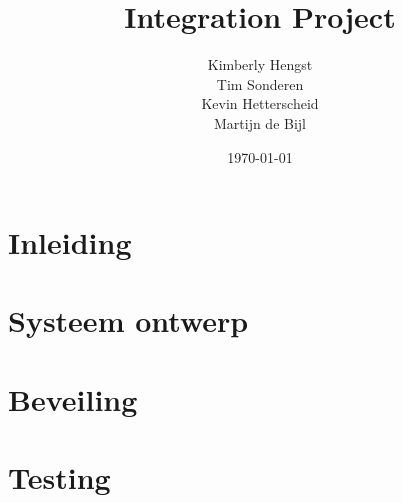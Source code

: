 \documentclass{article}
\title{Integration Project}
\author{Kimberly Hengst \\ Tim Sonderen \\ Kevin Hetterscheid \\ Martijn de Bijl}
\date{\today}
\begin{document}
\maketitle
\tableofcontents

\section{Inleiding}

\section{Systeem ontwerp}

\section{Beveiling}

\section{Testing}
\end{document}
